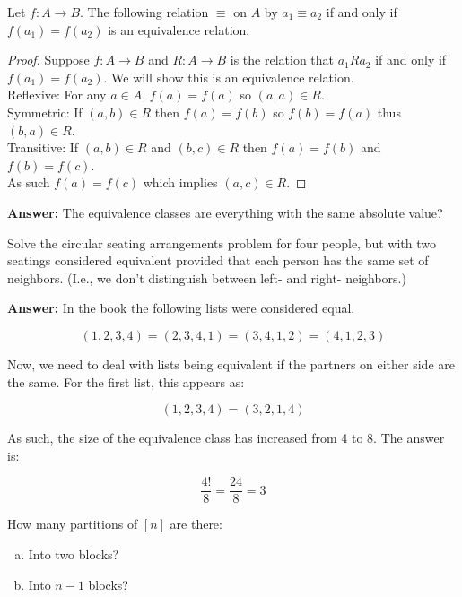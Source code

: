 \documentclass{article}
\begin{document}
\begin{thm}
Let $f: A \rightarrow B$. The following relation $\equiv$ on $A$ by $a_1 \equiv a_2$ if and only if $f(a_1) = f(a_2)$ is an equivalence relation.
\end{thm}
\begin{proof}
    Suppose $f: A \rightarrow B$ and $R: A \rightarrow B$ is the relation that $a_1 R a_2$ if and only if $f(a_1) = f(a_2)$. We will show this is an equivalence relation.\\
    Reflexive: For any $a \in A$, $f(a) = f(a)$ so $(a, a) \in R$. \\
    Symmetric: If $(a, b) \in R$ then $f(a) = f(b)$ so $f(b) = f(a)$ thus $(b, a) \in R$. \\
    Transitive: If $(a, b) \in R$ and $(b, c) \in R$ then $f(a) = f(b)$ and $f(b) = f(c)$. \\
    As such $f(a) = f(c)$ which implies $(a, c) \in R$.
\end{proof}

\textbf{Answer:}
The equivalence classes are everything with the same absolute value?

\begin{problem} %
Solve the circular seating arrangements problem for four people, but with two seatings considered equivalent provided that each person has the same set of neighbors. (I.e., we don't distinguish between left- and right- neighbors.)
\end{problem}

\textbf{Answer:}
In the book the following lists were considered equal.

\begin{equation*}
    (1,2,3,4) = (2,3,4,1) = (3,4,1,2) = (4,1,2,3)
\end{equation*}

Now, we need to deal with lists being equivalent if the partners on either side are the same. For the first list, this appears as:

\begin{equation*}
    (1,2,3,4) = (3,2,1,4)
\end{equation*}

As such, the size of the equivalence class has increased from 4 to 8. The answer is:

\begin{equation*}
    \frac{4!}{8} = \frac{24}{8} = 3
\end{equation*}

\pagebreak
\setcounter{problem}{10}
\begin{problem} %
How many partitions of $[n]$ are there:
\begin{enumerate}[(a)]
    \item Into two blocks?
    \item Into $n-1$ blocks?
\end{enumerate}
\end{problem}
\end{document}
